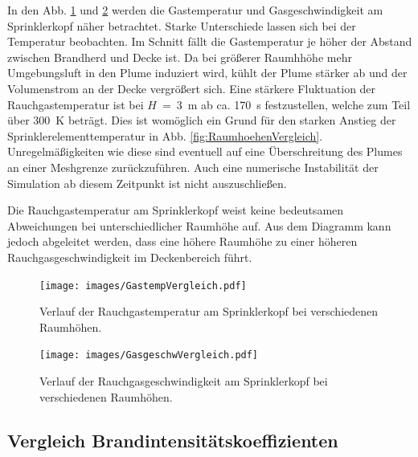 In den Abb. \ref{fig:GastempVergleich} und \ref{fig:GasgeschwVergleich} werden die Gastemperatur und Gasgeschwindigkeit am Sprinklerkopf näher betrachtet. Starke Unterschiede lassen sich bei der Temperatur beobachten. Im Schnitt fällt die Gastemperatur je höher der Abstand zwischen Brandherd und Decke ist. Da bei größerer Raumhhöhe mehr Umgebungsluft in den Plume induziert wird, kühlt der Plume stärker ab und der Volumenstrom an der Decke vergrößert sich. 
Eine stärkere Fluktuation der Rauchgastemperatur ist bei $H$~=~3~m ab ca. 170~s festzustellen, welche zum Teil über 300~K beträgt. Dies ist womöglich ein Grund für den starken Anstieg der Sprinklerelementtemperatur in Abb. \ref{fig:RaumhoehenVergleich}. Unregelmäßigkeiten wie diese sind eventuell auf eine Überschreitung des Plumes an einer Meshgrenze zurückzuführen. Auch eine numerische Instabilität der Simulation ab diesem Zeitpunkt ist nicht auszuschließen.

Die Rauchgastemperatur am Sprinklerkopf weist keine bedeutsamen Abweichungen bei unterschiedlicher Raumhöhe auf. Aus dem Diagramm kann jedoch abgeleitet werden, dass eine höhere Raumhöhe zu einer höheren Rauchgasgeschwindigkeit im Deckenbereich führt. 


\begin{figure}
    \centering
    \texttt{[image: images/GastempVergleich.pdf]}
    \caption{Verlauf der Rauchgastemperatur am Sprinklerkopf bei verschiedenen Raumhöhen.}
    \label{fig:GastempVergleich}
\end{figure}
\begin{figure}
    \centering
    \texttt{[image: images/GasgeschwVergleich.pdf]}
    \caption{Verlauf der Rauchgasgeschwindigkeit am Sprinklerkopf bei verschiedenen Raumhöhen.}
    \label{fig:GasgeschwVergleich}
\end{figure}



\FloatBarrier
\clearpage
\subsection{Vergleich  Brandintensitätskoeffizienten}

